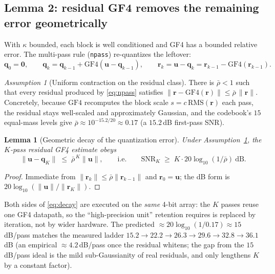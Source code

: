 \documentclass[11pt]{article}
\newtheorem{lemma}{Lemma}
\theoremstyle{remark}
\newtheorem{assumption}{Assumption}
\newcommand{\norm}[1]{\lVert #1 \rVert}
\newcommand{\rms}{\mathrm{RMS}}
\newcommand{\gf}{\mathrm{GF4}}
\begin{document}
\subsection{Lemma 2: residual GF4 removes the remaining error geometrically}

With $\kappa$ bounded, each block is well conditioned and GF4 has a bounded
relative error. The multi-pass rule (\texttt{npass}) re-quantizes the leftover:
\begin{equation}
\label{eq:npass}
\bm q_0=\bm 0,\qquad
\bm q_{k}=\bm q_{k-1}+\gf(\bm u-\bm q_{k-1}),\qquad
\bm r_k=\bm u-\bm q_k=\bm r_{k-1}-\gf(\bm r_{k-1}).
\end{equation}

\begin{assumption}[Uniform contraction on the residual class]
\label{ass:rho}
There is $\bar\rho<1$ such that every residual produced by \eqref{eq:npass}
satisfies $\norm{\bm r-\gf(\bm r)}\le\bar\rho\,\norm{\bm r}$. Concretely, because
$\gf$ recomputes the block scale $s=c\,\rms(\bm r)$ each pass, the residual stays
well-scaled and approximately Gaussian, and the codebook's $15$ equal-mass
levels give $\bar\rho\approx 10^{-15.2/20}\approx0.17$ (a $15.2$\,dB first-pass
SNR).
\end{assumption}

\begin{lemma}[Geometric decay of the quantization error]
\label{lem:res}
Under Assumption~\ref{ass:rho}, the $K$-pass residual GF4 estimate obeys
\begin{equation}
\label{eq:decay}
\norm{\bm u-\bm q_K}\;\le\;\bar\rho^{\,K}\norm{\bm u},
\qquad\text{i.e.}\qquad
\mathrm{SNR}_K \;\ge\; K\cdot 20\log_{10}(1/\bar\rho)\ \text{dB}.
\end{equation}
\end{lemma}

\begin{proof}
Immediate from $\norm{\bm r_k}\le\bar\rho\norm{\bm r_{k-1}}$ and $\bm r_0=\bm u$;
the dB form is $20\log_{10}(\norm{\bm u}/\norm{\bm r_K})$.
\end{proof}

Both sides of \eqref{eq:decay} are executed on the \emph{same} 4-bit array: the
$K$ passes reuse one GF4 datapath, so the ``high-precision unit'' retention
requires is replaced by iteration, not by wider hardware. The predicted
$\approx 20\log_{10}(1/0.17)\approx 15$\,dB/pass matches the measured ladder
$15.2\!\to\!22.2\!\to\!26.3\!\to\!29.6\!\to\!32.8\!\to\!36.1$\,dB
(an empirical $\approx\!4.2$\,dB/pass once the residual whitens; the gap from
the $15$\,dB/pass ideal is the mild sub-Gaussianity of real residuals, and only
lengthens $K$ by a constant factor).
\end{document}

